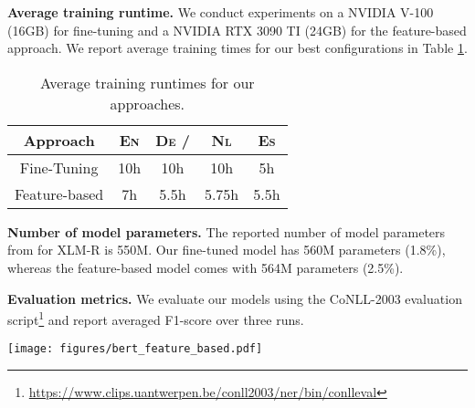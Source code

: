 \documentclass[11pt,a4paper]{article}
\begin{document}
\noindent
\textbf{Average training runtime.} We conduct experiments on a NVIDIA V-100 (16GB) for fine-tuning and a NVIDIA RTX 3090 TI (24GB) for the feature-based approach. We report average training times for our best configurations in Table \ref{tab:training_runtimes}.

\begin{table}[h!]
\centering
\begin{tabular}{ccccc}
\hline
 Approach       &  \textsc{En} & \textsc{De} /  & \textsc{Nl} & \textsc{Es} \\ \hline
 Fine-Tuning    &  10h            & 10h                        & 10h             &  5h \\
 Feature-based  &  7h          &  5.5h                 &  5.75h      & 5.5h \\
 \hline
\end{tabular}\caption{Average training runtimes for our approaches.}
\label{tab:training_runtimes}
\end{table}

\noindent
\textbf{Number of model parameters.} The reported number of model parameters from \citet{conneau2019unsupervised} for XLM-R is 550M. Our fine-tuned model has 560M parameters (1.8\%), whereas the feature-based model comes with 564M parameters (2.5\%).

\noindent
\textbf{Evaluation metrics.} We evaluate our models using the CoNLL-2003 evaluation script\footnote{\url{https://www.clips.uantwerpen.be/conll2003/ner/bin/conlleval}} and report averaged F1-score over three runs.











\begin{figure*}[t]
 \centering
 \texttt{[image: figures/bert\_feature\_based.pdf]}
 \label{overview-bert-feature-based-document-level}
\end{figure*}
\end{document}
